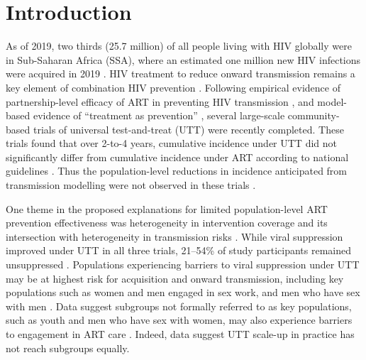 \section{Introduction}
\label{s:intro}
As of 2019, two thirds (25.7 million) of all people living with HIV globally
were in Sub-Saharan Africa (SSA), where
an estimated one million new HIV infections were acquired in 2019 \cite{AIDSinfo}.
HIV treatment to reduce onward transmission remains a key element of combination HIV prevention \cite{WHO2016ART}.
Following empirical evidence of partnership-level efficacy of ART
in preventing HIV transmission \cite{Lundgren2015,Danel2015,Cohen2016},
and model-based evidence of ``treatment as prevention'' \cite{Granich2009,Eaton2012,Cori2014},
several large-scale community-based trials of universal test-and-treat (UTT) were recently completed.
These trials found that over 2-to-4 years,
cumulative incidence under UTT did not significantly differ from
cumulative incidence under ART according to national guidelines \cite{Havlir2019,Hayes2019,Iwuji2018}.
Thus the population-level reductions in incidence anticipated from transmission modelling
were not observed in these trials \cite{Baral2019,Havlir2020}.
\par
One theme in the proposed explanations for limited population-level ART prevention effectiveness
was heterogeneity in intervention coverage and its intersection with
heterogeneity in transmission risks \cite{AbdoolKarim2019,Baral2019}.  %
While viral suppression improved under UTT in all three trials,
21--54\% of study participants remained unsuppressed \cite{Iwuji2018,Havlir2019,Hayes2019}.
Populations experiencing barriers to viral suppression under UTT
may be at highest risk for acquisition and onward transmission, including key populations such as
women and men engaged in sex work, and men who have sex with men \cite{Hakim2018,Nyato2019}.
Data suggest subgroups not formally referred to as key populations, such as youth and men who have sex with women, may also
experience barriers to engagement in ART care \cite{Green2020,Quinn2019}.
Indeed, data suggest UTT scale-up in practice has not reach subgroups equally. %
